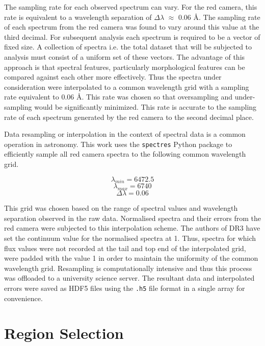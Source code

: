 The sampling rate for each observed spectrum can vary. For the red camera, this rate is equivalent to a wavelength separation of $\Delta\lambda$ $\approx$ 0.06 \r{A}\cite{vcotar2021galah}. The sampling rate of each spectrum from the red camera was found to vary around this value at the third decimal. For subsequent analysis each spectrum is required to be a vector of fixed size. A collection of spectra i.e. the total dataset that will be subjected to analysis must consist of a uniform set of these vectors. The advantage of this approach is that spectral features, particularly morphological features can be compared against each other more effectively. Thus the spectra under consideration were interpolated to a common wavelength grid with a sampling rate equivalent to 0.06 \r{A}. This rate was chosen so that oversampling and under-sampling would be significantly minimized. This rate is accurate to the sampling rate of each spectrum generated by the red camera to the second decimal place. 

Data resampling or interpolation in the context of spectral data is a common operation in astronomy. This work uses the \texttt{spectres} Python package \cite{carnall2017spectres} to efficiently sample all red camera spectra to the following common wavelength grid.

\[\lambda_{min} = 6472.5\]
\[\lambda_{max} = 6740\]
\[\Delta\lambda = 0.06\]

This grid was chosen based on the range of spectral values and wavelength separation observed in the raw data. Normalised spectra and their errors from the red camera were subjected to this interpolation scheme. The authors of DR3 have set the continuum value for the normalised spectra at 1. Thus, spectra for which flux values were not recorded at the tail and top end of the interpolated grid, were padded with the value 1 in order to maintain the uniformity of the common wavelength grid. Resampling is computationally intensive and thus this process was offloaded to a university science server. The resultant data and interpolated errors were saved as HDF5 files using the \texttt{.h5} file format in a single array for convenience. 

\section{Region Selection}

